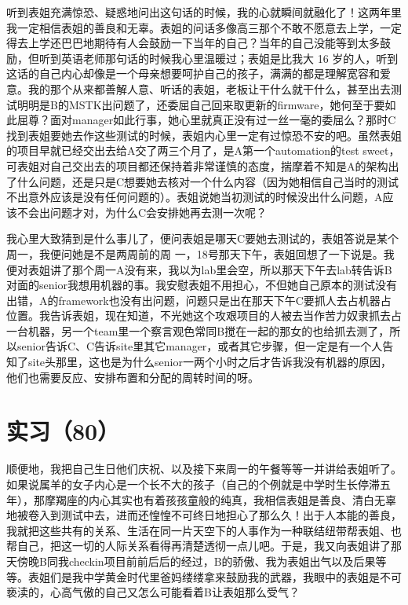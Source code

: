 \documentclass[12pt]{book}
\begin{document}
听到表姐充满惊恐、疑惑地问出这句话的时候，我的心就瞬间就融化了！这两年里我一定相信表姐的善良和无辜。表姐的问话多像高三那个不敢不愿意去上学，一定得去上学还巴巴地期待有人会鼓励一下当年的自己？当年的自己没能等到太多鼓励，但听到英语老师那句话的时候我心里温暖过；表姐是比我大 16 岁的人，听到这话的自己内心却像是一个母亲想要呵护自己的孩子，满满的都是理解宽容和爱意。我的那个从来都善解人意、听话的表姐，老板让干什么就干什么，甚至出去测试明明是B的MSTK出问题了，还委屈自己回来取更新的firmware，她何至于要如此屈尊？面对manager如此行事，她心里就真正没有过一丝一毫的委屈么？那时C找到表姐要她去作这些测试的时候，表姐内心里一定有过惊恐不安的吧。虽然表姐的项目早就已经交出去给A交了两三个月了，是A第一个automation的test sweet，可表姐对自己交出去的项目都还保持着非常谨慎的态度，揣摩着不知是A的架构出了什么问题，还是只是C想要她去核对一个什么内容（因为她相信自己当时的测试不出意外应该是没有任何问题的）。表姐说她当初测试的时候没出什么问题，A应该不会出问题才对，为什么C会安排她再去测一次呢？

我心里大致猜到是什么事儿了，便问表姐是哪天C要她去测试的，表姐答说是某个周一，我便问她是不是两周前的周 一，18号那天下午，表姐回想了一下说是。我便对表姐讲了那个周一A没有来，我以为lab里会空，所以那天下午去lab转告诉B对面的senior我想用机器的事。我安慰表姐不用担心，不但她自己原本的测试没有出错，A的framework也没有出问题，问题只是出在那天下午C要抓人去占机器占位置。我告诉表姐，现在知道，不光她这个攻艰项目的人被去当作苦力奴隶抓去占一台机器，另一个team里一个察言观色常同B搅在一起的那女的也给抓去测了，所以senior告诉C、C告诉site里其它manager，或者其它步骤，但一定是有一个人告知了site头那里，这也是为什么senior一两个小时之后才告诉我没有机器的原因，他们也需要反应、安排布置和分配的周转时间的呀。

\section{实习（80）　}
\label{sec-5-83}

顺便地，我把自己生日他们庆祝、以及接下来周一的午餐等等一并讲给表姐听了。如果说属羊的女子内心是一个长不大的孩子（自己的个例就是中学时生长停滞五年），那摩羯座的内心其实也有着孩孩童般的纯真，我相信表姐是善良、清白无辜地被卷入到测试中去，进而还惶惶不可终日地担心了那么久！出于人本能的善良，我就把这些共有的关系、生活在同一片天空下的人事作为一种联结纽带帮表姐、也帮自己，把这一切的人际关系看得再清楚透彻一点儿吧。于是，我又向表姐讲了那天傍晚B同我checkin项目前前后后的经过，B的骄傲、我为表姐出气以及后果等等。表姐们是我中学黄金时代里爸妈缕缕拿来鼓励我的武器，我眼中的表姐是不可亵渎的，心高气傲的自己又怎么可能看着B让表姐那么受气？
\end{document}
